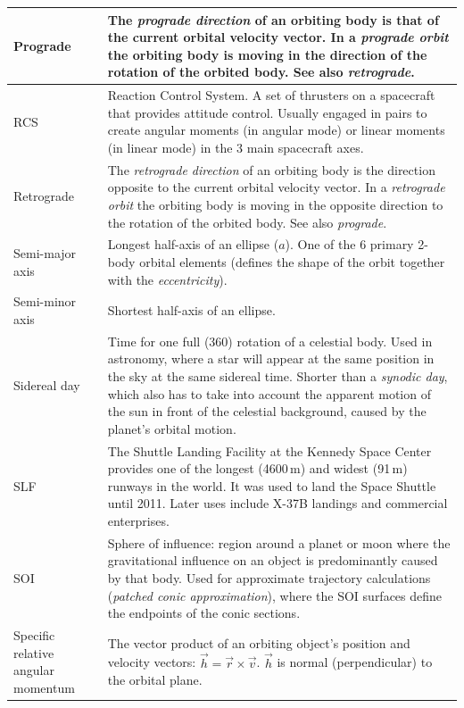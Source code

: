 \documentclass[Orbiter User Manual.tex]{subfiles}
\begin{document}
\begin{longtable}{ >{\RaggedRight}p{} p{} }
	\hline
	Prograde & The \emph{prograde direction} of an orbiting body is that of the
		current orbital velocity vector. In a \emph{prograde orbit} the orbiting
		body is moving in the direction of the rotation of the orbited body. See
		also \emph{retrograde}.\\
	\hline
	RCS & Reaction Control System. A set of thrusters on a spacecraft that
		provides attitude control. Usually engaged in pairs to create angular
		moments (in angular mode) or linear moments (in linear mode) in the 3
		main spacecraft axes.\\
	\hline
	Retrograde & The \textit{retrograde direction} of an orbiting body is the
		direction opposite to the current orbital velocity vector. In a
		\emph{retrograde orbit} the orbiting body is moving in the opposite
		direction to the rotation of the orbited body. See also
		\emph{prograde}.\\
	\hline
	Semi-major axis & Longest half-axis of an ellipse ($a$). One of the 6
		primary 2-body orbital elements (defines the shape of the orbit together
		with the \emph{eccentricity}).\\
	\hline
	Semi-minor axis & Shortest half-axis of an ellipse.\\
	\hline
	Sidereal day & Time for one full (360\deg{}) rotation of a celestial body.
		Used in astronomy, where a star will appear at the same position in the
		sky at the same sidereal time. Shorter than a \emph{synodic day}, which
		also has to take into account the apparent motion of the sun in front of
		the celestial background, caused by the planet's orbital motion.\\
	\hline
	SLF & The Shuttle Landing Facility at the Kennedy Space Center provides one of
		the longest (4600\,m) and widest (91\,m) runways in the world. It was used
		to land the Space Shuttle until 2011. Later uses include X-37B landings and
		commercial enterprises.\\
	\hline
	SOI & Sphere of influence: region around a planet or moon where the
		gravitational influence on an object is predominantly caused by that
		body. Used for approximate trajectory calculations (\emph{patched conic
		approximation}), where the SOI surfaces define the endpoints of the
		conic sections.\\
	\hline
	Specific relative angular momentum & The vector product of an orbiting
		object's position and velocity vectors:
		$\vec{h} = \vec{r} \times \vec{v}$. $\vec{h}$ is normal (perpendicular)
		to the orbital plane.\\

\end{longtable}
\end{document}
